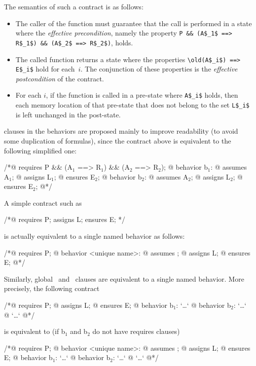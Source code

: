 The semantics of such a contract is as follows:
\begin{itemize}
\item The caller of the function must guarantee that the call is
  performed in a state where the \emph{effective precondition}, namely the property
  \lstinline|P && (A$_1$ ==> R$_1$) && (A$_2$ ==> R$_2$)|, holds.
\item The called function returns a state where
the properties \lstinline|\old(A$_i$) ==> E$_i$| hold for each~$i$.
The conjunction of these properties is the \emph{effective postcondition} of the contract.
\item For each $i$, if the function is called in a pre-state where
  \lstinline|A$_i$| holds, then each memory location of that pre-state 
  that does not belong to the set \lstinline|L$_i$| is left unchanged in 
  the post-state.
\end{itemize}


\requires{} clauses in the behaviors are proposed
mainly to improve readability (to avoid some duplication of
formulas), since the contract above is equivalent to the following
simplified one:
\begin{listing}{1}
/*@ requires P && (A$_1$ ==> R$_1$) && (A$_2$ ==> R$_2$);
  @ behavior b$_1$:
  @   assumes A$_1$;
  @   assigns L$_1$;
  @   ensures E$_2$;
  @ behavior b$_2$:
  @   assumes A$_2$;
  @   assigns L$_2$;
  @   ensures E$_2$;
  @*/
\end{listing}

A simple contract such as
\begin{listing}{1}
/*@ requires P; assigns L; ensures E; */
\end{listing}
is actually equivalent to a single named behavior as follows:
\begin{listing}{1}
/*@ requires P;
  @ behavior <unique name>:
  @   assumes \true;
  @   assigns L;
  @   ensures E;
  @*/
\end{listing}
Similarly, global \assigns\ and \ensures\ clauses are equivalent to a
single named behavior. More precisely, the following contract
\begin{listing}{1}
/*@ requires P;
  @ assigns L;
  @ ensures E;
  @ behavior b$_1$: `\dots`
  @ behavior b$_2$: `\dots`
  @ `\dots`
  @*/
\end{listing}
is equivalent to (if b$_1$ and b$_2$ do not have requires clauses)
\begin{listing}{1}
/*@ requires P;
  @ behavior <unique name>:
  @   assumes \true;
  @   assigns L;
  @   ensures E;
  @ behavior b$_1$: `\dots`
  @ behavior b$_2$: `\dots`
  @ `\dots`
  @*/
\end{listing}

